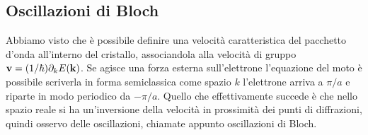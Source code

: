 \documentclass[a4paper,12pt]{article}
\begin{document}
\subsection{Oscillazioni di Bloch}



Abbiamo visto che è possibile definire una velocità caratteristica del pacchetto d'onda all'interno del cristallo, associandola alla velocità di gruppo ${\it\bf v} = (1/\hbar) \partial_kE({\it\bf k})$. Se agisce una forza esterna sull'elettrone l'equazione del moto è possibile scriverla in forma semiclassica come
spazio $k$ l'elettrone arriva a $\pi/a$ e riparte in modo periodico da $-\pi/a$. Quello che effettivamente succede è che nello spazio reale si ha un'inversione della velocità in prossimità dei punti di diffrazioni, quindi osservo delle oscillazioni, chiamate appunto oscillazioni di Bloch.  
\end{document}
